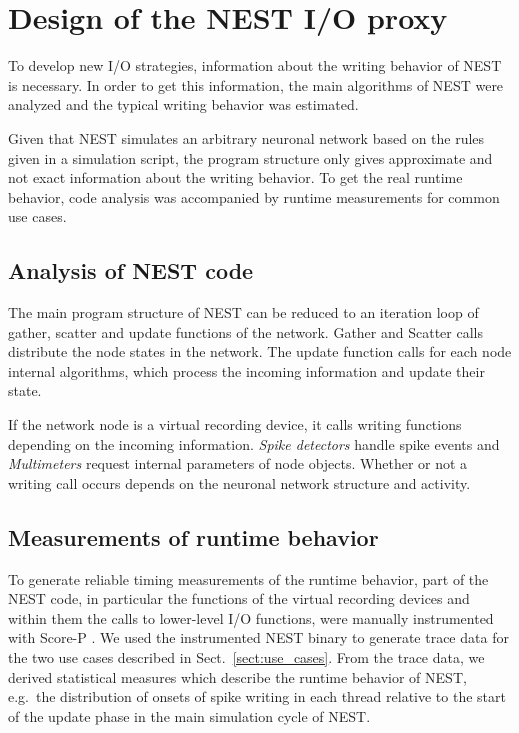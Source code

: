 \documentclass[]{YIC2015}
\begin{document}
\section{Design of the NEST I/O proxy}

To develop new I/O strategies, information about the writing behavior
of NEST is necessary. In order to get this information, the main
algorithms of NEST were analyzed and the typical writing behavior was
estimated.

Given that NEST simulates an arbitrary neuronal network based on the
rules given in a simulation script, the program structure only gives
approximate and not exact information about the writing behavior. To
get the real runtime behavior, code analysis was accompanied by runtime
measurements for common use cases.

\subsection{Analysis of NEST code}

The main program structure of NEST can be reduced to an iteration loop
of gather, scatter and update functions of the network. Gather and
Scatter calls distribute the node states in the network. The update
function calls for each node internal algorithms, which process the
incoming information and update their state.

If the network node is a virtual recording device, it calls writing
functions depending on the incoming information. \emph{Spike
  detectors} handle spike events and \emph{Multimeters} request
internal parameters of node objects. Whether or not a writing call
occurs depends on the neuronal network structure and activity.

\subsection{Measurements of runtime behavior}

To generate reliable timing measurements of the runtime behavior, part
of the NEST code, in particular the functions of the virtual recording
devices and within them the calls to lower-level I/O functions, were
manually instrumented with Score-P \cite{ScoreP}.
%
We used the instrumented NEST binary to generate trace data for the
two use cases described in Sect.~\ref{sect:use_cases}.
From the trace data, we derived
statistical measures which describe the runtime behavior of NEST,
e.g.~the distribution of onsets of spike writing in each thread
relative to the start of the update phase in the main simulation cycle
of NEST.
\end{document}
